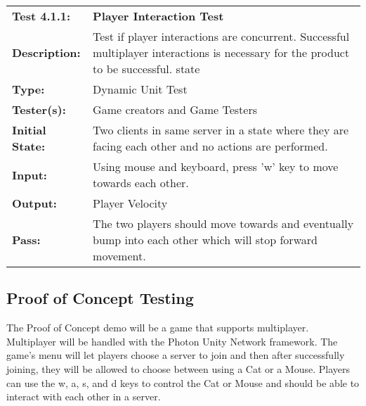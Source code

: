 \documentclass[12pt, titlepage]{article}
\begin{document}
\begin{enumerate}
\begin{mdframed}[linewidth=1pt]
\begin{tabularx}{\textwidth}{@{}p{3cm}X@{}}
{\bf Test 4.1.1:} & {\bf Player Interaction Test}\\[\baselineskip]
{\bf Description:} & Test if player interactions are concurrent. Successful multiplayer interactions is necessary for the product to be successful. state\\[0.5\baselineskip]
{\bf Type:} & Dynamic Unit Test\\[0.5\baselineskip]
{\bf Tester(s):} & Game creators and Game Testers\\[0.5\baselineskip]
{\bf Initial State:} & Two clients in same server in a state where they are facing each other and no actions are performed.\\[0.5\baselineskip]
{\bf Input:} & Using mouse and keyboard, press 'w' key to move towards each other.\\[0.5\baselineskip]
{\bf Output:} & Player Velocity\\[0.5\baselineskip]
{\bf Pass:} & The two players should move towards and eventually bump into each other which will stop forward movement.
\end{tabularx}
\end{mdframed}

\subsection{Proof of Concept Testing}
The Proof of Concept demo will be a game that supports multiplayer. Multiplayer will be handled with the Photon Unity Network framework. 
The game's menu will let players choose a server to join and then after successfully joining, they will be allowed to choose between using a Cat or a Mouse.
Players can use the w, a, s, and d keys to control the Cat or Mouse and should be able to interact with each other in a server.


\end{enumerate}
\end{document}
